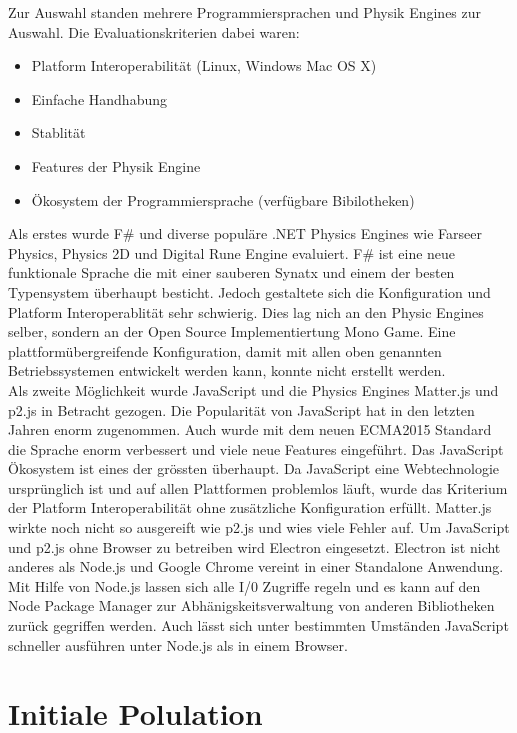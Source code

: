     Zur Auswahl standen mehrere Programmiersprachen und Physik Engines zur Auswahl. Die Evaluationskriterien dabei waren:
    \begin{itemize}
      \item Platform Interoperabilität (Linux, Windows Mac OS X)
      \item Einfache Handhabung
      \item Stablität
      \item Features der Physik Engine
      \item Ökosystem der Programmiersprache (verfügbare Bibilotheken)
    \end{itemize}

    Als erstes wurde F\# und diverse populäre .NET Physics Engines wie Farseer Physics, Physics 2D und Digital Rune Engine evaluiert. %
    F\# ist eine neue funktionale Sprache die mit einer sauberen Synatx und einem der besten Typensystem überhaupt besticht.
    Jedoch gestaltete sich die Konfiguration und Platform Interoperablität sehr schwierig. Dies lag nich an den Physic Engines selber,
    sondern an der Open Source Implementiertung Mono Game. Eine plattformübergreifende Konfiguration,
    damit mit allen oben genannten Betriebssystemen entwickelt werden kann, konnte nicht erstellt werden.\\
    Als zweite Möglichkeit wurde JavaScript und die Physics Engines Matter.js und p2.js in Betracht gezogen.
    Die Popularität von JavaScript hat in den letzten Jahren enorm zugenommen.
    Auch wurde mit dem neuen ECMA2015 Standard die Sprache enorm verbessert und viele neue Features eingeführt. Das JavaScript Ökosystem ist eines der grössten überhaupt.
    Da JavaScript eine Webtechnologie ursprünglich ist und auf allen Plattformen problemlos läuft, wurde das Kriterium der Platform Interoperabilität ohne zusätzliche Konfiguration erfüllt.
    Matter.js wirkte noch nicht so ausgereift wie p2.js und wies viele Fehler auf. Um JavaScript und p2.js ohne Browser zu betreiben wird Electron eingesetzt.
    Electron ist nicht anderes als Node.js und Google Chrome vereint in einer Standalone Anwendung.
    Mit Hilfe von Node.js lassen sich alle I/0 Zugriffe regeln und es kann auf den Node Package Manager zur Abhänigskeitsverwaltung von anderen Bibliotheken zurück gegriffen werden.
    Auch lässt sich unter bestimmten Umständen JavaScript schneller ausführen unter Node.js als in einem Browser.

  \section{Initiale Polulation\label{sec:Initiale Polulation}}

